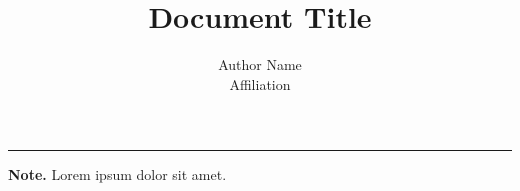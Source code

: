 \documentclass	[a4paper,11pt, hidelinks]{article}
\date			{\displaydate{date}}
\title{Document Title}
\author{ 
	Author Name\\
	\small{Affiliation}\\
}
\begin{document}
\maketitle
\thispagestyle{fancy}


\vspace*{\fill}
\rule{\textwidth}{0.4pt}
\footnotesize \textbf{Note.} Lorem ipsum dolor sit amet.
\end{document}
